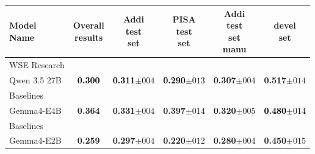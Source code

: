 \begin{tabularx}{\textwidth}{X | c c c c c}
\hline
\makecell[b]{\textbf{Model} \\ \textbf{Name}} & \makecell[b]{\textbf{Overall} \\ \textbf{results}} & \makecell[b]{\textbf{Addi} \\ \textbf{test} \\ \textbf{set}} & \makecell[b]{\textbf{PISA} \\ \textbf{test} \\ \textbf{set}} & \makecell[b]{\textbf{Addi} \\ \textbf{test} \\ \textbf{set} \\ \textbf{manu}} & \makecell[b]{\textbf{devel} \\ \textbf{set}} \\
\hline
WSE Research\\\subcatarrow{}Qwen 3.5 27B & \textbf{\textcolor{Black}{0.300}} & \textbf{\textcolor{Black}{0.311$\pm{}004$}} & \textbf{\textcolor{Black}{0.290$\pm{}013$}} & \textbf{\textcolor{White!50!BrickRed}{0.307$\pm{}004$}} & \textbf{\textcolor{BrickRed}{0.517$\pm{}014$}} \\
Baselines\\\subcatarrow{}Gemma4-E4B & \textbf{\textcolor{BrickRed}{0.364}} & \textbf{\textcolor{BrickRed}{0.331$\pm{}004$}} & \textbf{\textcolor{BrickRed}{0.397$\pm{}014$}} & \textbf{\textcolor{BrickRed}{0.320$\pm{}005$}} & \textbf{\textcolor{Black}{0.480$\pm{}014$}} \\
Baselines\\\subcatarrow{}Gemma4-E2B & \textbf{\textcolor{NavyBlue}{0.259}} & \textbf{\textcolor{NavyBlue}{0.297$\pm{}004$}} & \textbf{\textcolor{NavyBlue}{0.220$\pm{}012$}} & \textbf{\textcolor{NavyBlue}{0.280$\pm{}004$}} & \textbf{\textcolor{NavyBlue}{0.450$\pm{}015$}} \\
\hline
\end{tabularx}